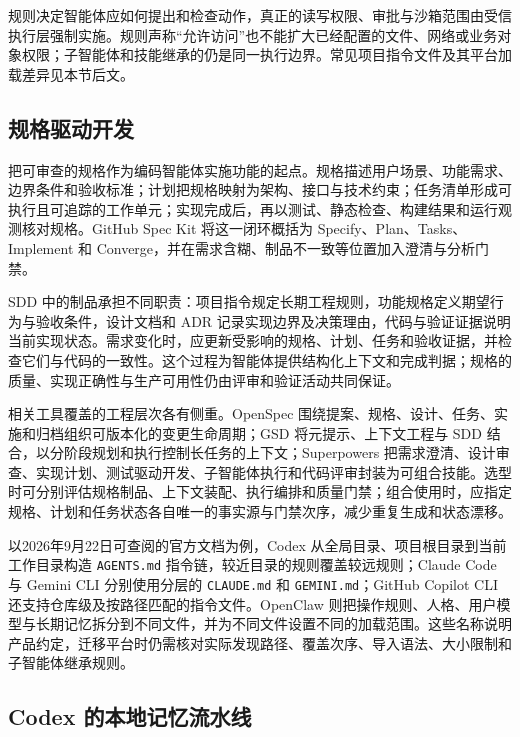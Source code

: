 \documentclass[../textbook.tex]{subfiles}
\begin{document}
规则决定智能体应如何提出和检查动作，真正的读写权限、审批与沙箱范围由受信执行层强制实施。规则声称“允许访问”也不能扩大已经配置的文件、网络或业务对象权限；子智能体和技能继承的仍是同一执行边界。常见项目指令文件及其平台加载差异见本节后文。

\subsection{规格驱动开发}
把可审查的规格作为编码智能体实施功能的起点。规格描述用户场景、功能需求、边界条件和验收标准；计划把规格映射为架构、接口与技术约束；任务清单形成可执行且可追踪的工作单元；实现完成后，再以测试、静态检查、构建结果和运行观测核对规格。GitHub Spec Kit 将这一闭环概括为 Specify、Plan、Tasks、Implement 和 Converge，并在需求含糊、制品不一致等位置加入澄清与分析门禁\cite{githubWhatSpecdrivenDevelopment2026}。

SDD 中的制品承担不同职责：项目指令规定长期工程规则，功能规格定义期望行为与验收条件，设计文档和 ADR 记录实现边界及决策理由，代码与验证证据说明当前实现状态。需求变化时，应更新受影响的规格、计划、任务和验收证据，并检查它们与代码的一致性。这个过程为智能体提供结构化上下文和完成判据；规格的质量、实现正确性与生产可用性仍由评审和验证活动共同保证。

相关工具覆盖的工程层次各有侧重。OpenSpec 围绕提案、规格、设计、任务、实施和归档组织可版本化的变更生命周期；GSD 将元提示、上下文工程与 SDD 结合，以分阶段规划和执行控制长任务的上下文；Superpowers 把需求澄清、设计审查、实现计划、测试驱动开发、子智能体执行和代码评审封装为可组合技能\cite{openspeccontributorsOpenSpec2026,tachesGSDDocumentation2026,vincentSuperpowers2026}。选型时可分别评估规格制品、上下文装配、执行编排和质量门禁；组合使用时，应指定规格、计划和任务状态各自唯一的事实源与门禁次序，减少重复生成和状态漂移。

以2026年9月22日可查阅的官方文档为例，Codex 从全局目录、项目根目录到当前工作目录构造 \texttt{AGENTS.md} 指令链，较近目录的规则覆盖较远规则；Claude Code 与 Gemini CLI 分别使用分层的 \texttt{CLAUDE.md} 和 \texttt{GEMINI.md}；GitHub Copilot CLI 还支持仓库级及按路径匹配的指令文件\cite{openaiCustomInstructionsAGENTSmd,anthropicManageClaudeMemory,googleProvideContextGEMINImd,githubAddingCustomInstructions}。OpenClaw 则把操作规则、人格、用户模型与长期记忆拆分到不同文件，并为不同文件设置不同的加载范围\cite{openclawAgentWorkspace}。这些名称说明产品约定，迁移平台时仍需核对实际发现路径、覆盖次序、导入语法、大小限制和子智能体继承规则。

\subsection{Codex 的本地记忆流水线}
\end{document}
